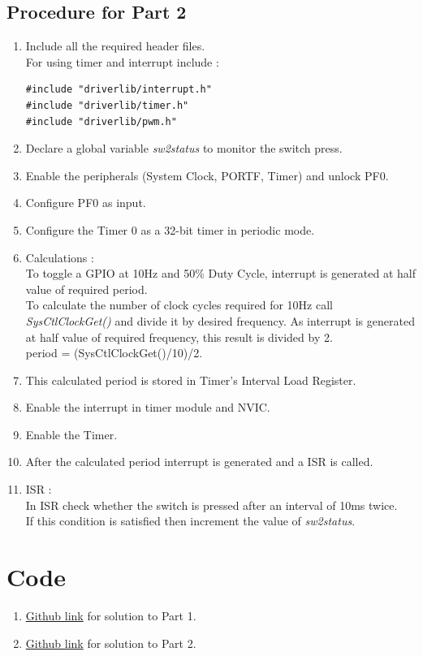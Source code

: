\documentclass[a4paper,12pt,oneside]{book}
\begin{document}
\subsection{Procedure for Part 2}
\begin{enumerate}
\item Include all the required header files.\\
For using timer and interrupt include :
\begin{lstlisting}
#include "driverlib/interrupt.h"
#include "driverlib/timer.h"
#include "driverlib/pwm.h"
\end{lstlisting}
\item Declare a global variable \textit{sw2status} to monitor the switch press.
\item Enable the peripherals (System Clock, PORTF, Timer) and unlock PF0.
\item Configure PF0 as input. 
\item Configure the Timer 0 as a 32-bit timer in periodic mode.
\item Calculations :\\
To toggle a GPIO at 10Hz and 50\% Duty Cycle, interrupt is generated at half value of required period.\\
To calculate the number of clock cycles required for 10Hz call \textit{SysCtlClockGet()} and divide it by desired frequency. As interrupt is generated at half value of required frequency, this result is divided by 2. \\
period = (SysCtlClockGet()/10)/2.
\item This calculated period is stored in Timer's Interval Load Register.
\item Enable the interrupt in timer module and NVIC.
\item Enable the Timer.
\item After the calculated period interrupt is generated and a ISR is called.
\item ISR : \\
In ISR check whether the switch is pressed after an interval of 10ms twice.\\
If this condition is satisfied then increment the value of \textit{sw2status}.
\end{enumerate}

\section{Code}
\begin{enumerate}
\item \href{https://github.com/eYSIP-2016/eYSIP-2016-Around-the-world-of-Embedded-Systems/blob/origin/master/Solutions/lab2\%20solutions/lab2_1solution.c}{Github link} for solution to Part 1.
\item \href{https://github.com/eYSIP-2016/eYSIP-2016-Around-the-world-of-Embedded-Systems/blob/origin/master/Solutions/lab2\%20solutions/lab2_2solution.c}{Github link} for solution to Part 2.
\end{enumerate}
\end{document}
